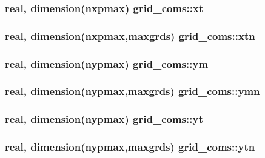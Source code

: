 \subsubsection[{xt}]{\setlength{\rightskip}{0pt plus 5cm}real, dimension(nxpmax) grid\+\_\+coms\+::xt}\label{namespacegrid__coms_ab408e5eee5cb44c67ad1321c400c71ec}
\hypertarget{namespacegrid__coms_ac434d86587ed3416352d2ee40a8a542f}{}
\subsubsection[{xtn}]{\setlength{\rightskip}{0pt plus 5cm}real, dimension(nxpmax,maxgrds) grid\+\_\+coms\+::xtn}\label{namespacegrid__coms_ac434d86587ed3416352d2ee40a8a542f}
\hypertarget{namespacegrid__coms_a4e0c01da9f5b650af168d526fc6161e6}{}
\subsubsection[{ym}]{\setlength{\rightskip}{0pt plus 5cm}real, dimension(nypmax) grid\+\_\+coms\+::ym}\label{namespacegrid__coms_a4e0c01da9f5b650af168d526fc6161e6}
\hypertarget{namespacegrid__coms_ac86adbc4cb710451d5b9ae53178a756b}{}
\subsubsection[{ymn}]{\setlength{\rightskip}{0pt plus 5cm}real, dimension(nypmax,maxgrds) grid\+\_\+coms\+::ymn}\label{namespacegrid__coms_ac86adbc4cb710451d5b9ae53178a756b}
\hypertarget{namespacegrid__coms_a24ff2ae7949aa76dc0d798ef5baa5aab}{}
\subsubsection[{yt}]{\setlength{\rightskip}{0pt plus 5cm}real, dimension(nypmax) grid\+\_\+coms\+::yt}\label{namespacegrid__coms_a24ff2ae7949aa76dc0d798ef5baa5aab}
\hypertarget{namespacegrid__coms_aa853f8064bf96a5159ba89902bf37efb}{}
\subsubsection[{ytn}]{\setlength{\rightskip}{0pt plus 5cm}real, dimension(nypmax,maxgrds) grid\+\_\+coms\+::ytn}\label{namespacegrid__coms_aa853f8064bf96a5159ba89902bf37efb}
